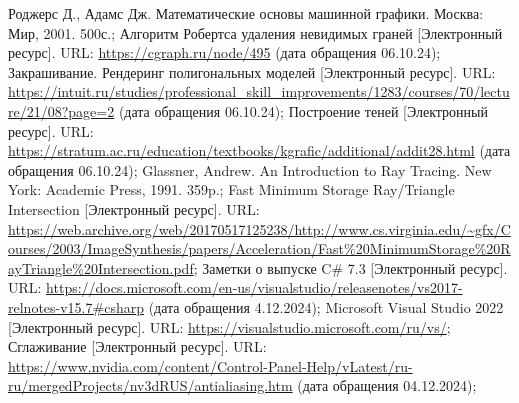 \begin{thebibliography}{}
	 Роджерс Д., Адамс Дж. Математические основы машинной графики. Москва: Мир, 2001. 500с.;
	 Алгоритм Робертса удаления невидимых граней [Электронный ресурс]. URL: \url{https://cgraph.ru/node/495} (дата обращения 06.10.24);
	 Закрашивание. Рендеринг полигональных моделей [Электронный ресурс]. URL: \url{https://intuit.ru/studies/professional\_skill\_improvements/1283/courses/70/lecture/21/08?page=2} (дата обращения 06.10.24);
	 Построение теней [Электронный ресурс]. URL: \url{https://stratum.ac.ru/education/textbooks/kgrafic/additional/addit28.html} (дата обращения 06.10.24);
	 Glassner, Andrew. An Introduction to Ray Tracing. New York: Academic Press, 1991. 359p.;
	 Fast Minimum Storage Ray/Triangle Intersection [Электронный ресурс]. URL: \url{https://web.archive.org/web/20170517125238/http://www.cs.virginia.edu/~gfx/Courses/2003/ImageSynthesis/papers/Acceleration/Fast\%20MinimumStorage\%20RayTriangle\%20Intersection.pdf};
	 Заметки о выпуске C# 7.3 [Электронный ресурс]. URL: \url{https://docs.microsoft.com/en-us/visualstudio/releasenotes/vs2017-relnotes-v15.7#csharp} (дата обращения 4.12.2024);
	 Microsoft Visual Studio 2022 [Электронный ресурс]. URL: \url{https://visualstudio.microsoft.com/ru/vs/};
	 Сглаживание [Электронный ресурс]. URL: \url{https://www.nvidia.com/content/Control-Panel-Help/vLatest/ru-ru/mergedProjects/nv3dRUS/antialiasing.htm} (дата обращения 04.12.2024);
	
\end{thebibliography}
